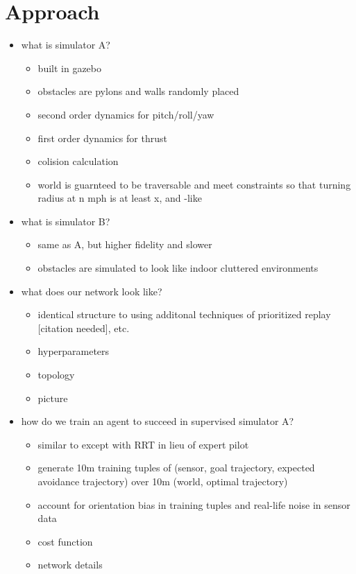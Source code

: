 \documentclass[paper=a4, fontsize=11pt]{scrartcl} %
\begin{document}
\section{Approach} 
\begin{itemize}
	\item what is simulator A?
	\begin{itemize}
		\item built in gazebo
		\item obstacles are pylons and walls randomly placed
		\item second order dynamics for pitch/roll/yaw
		\item first order dynamics for thrust
		\item colision calculation
		\item world is guarnteed to be traversable and meet constraints so that turning radius at n mph is at least x, and \cite{Richter2014}-like 
	\end{itemize}

	\item what is simulator B?
	\begin{itemize}
		\item same as A, but higher fidelity and slower
		\item obstacles are simulated to look like indoor cluttered environments
	\end{itemize}

	\item what does our network look like?
	\begin{itemize}
		\item identical structure to \cite{Lillicrap2015} using additonal techniques of prioritized replay [citation needed], etc.
		\item hyperparameters
		\item topology
		\item picture
	\end{itemize}

	\item how do we train an agent to succeed in supervised simulator A?
	\begin{itemize}
		\item similar to \cite{Kim2015} except with RRT in lieu of expert pilot 
		\item generate 10m training tuples of (sensor, goal trajectory, expected avoidance trajectory) over 10m (world, optimal trajectory)
		\item account for orientation bias in training tuples and real-life noise in sensor data
		\item cost function
		\item network details
	\end{itemize}


\end{itemize}
\end{document}
